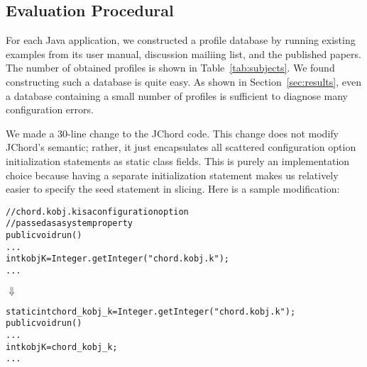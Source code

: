 \subsection{Evaluation Procedural}

For each Java application, we constructed a profile database
by running existing examples from its user manual, discussion
mailiing list, and the published papers. The number of obtained
 profiles is shown in Table~\ref{tab:subjects}. We
found constructing such a database is quite easy. As shown
in Section~\ref{sec:results}, even a database containing
a small number of profiles is sufficient to
diagnose many configuration errors.


We made a 30-line change to the JChord code. This change
does not modify JChord's semantic; rather, it just encapsulates
all scattered configuration option initialization statements 
as static class fields. This is purely an implementation
choice because having a separate initialization statement
makes us relatively easier to specify the seed statement
in slicing. Here is a sample modification:



\begin{CodeOut}
\begin{alltt}
   // chord.kobj.k is a configuration option
   // passed as a system property
   public void run() \ttlcb
     ...
     int kobjK = Integer.getInteger("chord.kobj.k");
     ...
   \ttrcb
\end{alltt}
\end{CodeOut}
\vspace{-4mm}
\hspace{20mm}$\Downarrow$ 
\begin{CodeOut}
\begin{alltt}
   static int chord\_kobj\_k = Integer.getInteger("chord.kobj.k");
   public void run() \ttlcb
     ...
     int kobjK = chord\_kobj\_k; 
     ...
   \ttrcb
\end{alltt}
\end{CodeOut}






